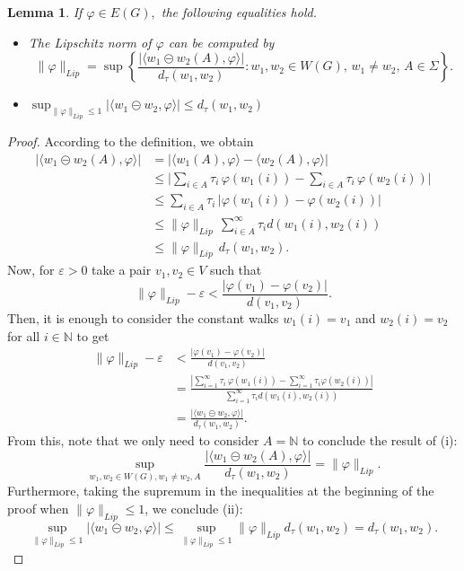\documentclass[preprint,12pt]{elsarticle}
\newtheorem{lemma}[theorem]{Lemma}
\begin{document}
\begin{lemma}
If $\varphi \in E(G),$ the following equalities hold.
\begin{itemize}
    \item[(i)] The Lipschitz norm of $\varphi$ can be computed by
$$\|\varphi\|_{Lip} = \sup \left\{\frac{\big| \langle w_1 \circleddash w_2(A), \varphi \rangle \big|}{d_\tau(w_1,w_2)}: w_1,w_2 \in W(G), \, w_1 \ne w_2, \, A \in \Sigma \right\}.
$$
\item[(ii)] $\sup_{\|\varphi\|_{Lip}\leq 1}\big| \langle w_1 \circleddash w_2, \varphi \rangle \big| \le {d_\tau(w_1,w_2)}$
\end{itemize}
\end{lemma}
\begin{proof}
According to the definition, we obtain
\begin{align*} 
    \big| \langle w_1 \circleddash w_2(A), \varphi \rangle \big| &= \big|\langle w_1(A), \varphi \rangle - \langle w_2(A), \varphi \rangle \big| \\
& \le
\Big| \sum_{i \in A} \tau_i \, \varphi(w_1(i)) - \sum_{i\in A} \tau_i \, \varphi(w_2(i)) \Big| \\
&\le  \sum_{i\in A} \tau_i \, \big| \varphi(w_1(i)) -   \varphi(w_2(i)) \big|\\ &\le \|\varphi\|_{Lip} \, \sum_{i\in A}^\infty \tau_i d(w_1(i),w_2(i))\\ & \le \|\varphi\|_{Lip} \, d_\tau(w_1,w_2). 
\end{align*}
Now, for $\varepsilon >0$ take a pair $v_1,v_2 \in V$ such that
$$
\|\varphi\|_{Lip} - \varepsilon < \frac{ | \varphi(v_1)- \varphi(v_2) |}{d(v_1,v_2)}.
$$
Then, it is enough to consider the constant walks $w_1(i)= v_1$ and
$w_2(i)=v_2$ for all $i \in \mathbb N$ to get
\begin{align*}
    \|\varphi\|_{Lip} - \varepsilon &< \frac{ | \varphi(v_1)- \varphi(v_2) |}{d(v_1,v_2)} \\
    & = \frac{ | \sum_{i=1}^\infty \tau_i \,  \varphi(w_1(i))-  \sum_{i=1}^\infty \tau_i \varphi(w_2(i)) |}{ \sum_{i=1}^\infty \tau_i d(w_1(i),w_2(i))}\\
&= \frac{\big| \langle w_1 \circleddash w_2, \varphi \rangle \big|}{d_\tau(w_1,w_2)}.
\end{align*}
From this, note that we only need to consider $A= \mathbb N$ to conclude the result of (i):
$$
\sup_{w_1,w_2 \in W(G), w_1 \ne w_2, A} \frac{\big| \langle w_1 \circleddash w_2 (A), \varphi \rangle \big|}{d_\tau(w_1,w_2)}
=\|\varphi\|_{Lip}.$$
Furthermore, taking the supremum in the inequalities at the beginning of the proof when $\|\varphi\|_{Lip}\le 1$, we conclude (ii):
$$\sup_{\|\varphi\|_{Lip}\leq 1} |\langle w_1 \circleddash w_2,\varphi\rangle|\leq\sup_{\|\varphi\|_{Lip}\leq 1} \|\varphi\|_{Lip}d_\tau(w_1,w_2)=d_\tau(w_1,w_2).$$
\end{proof}
 
\end{document}
